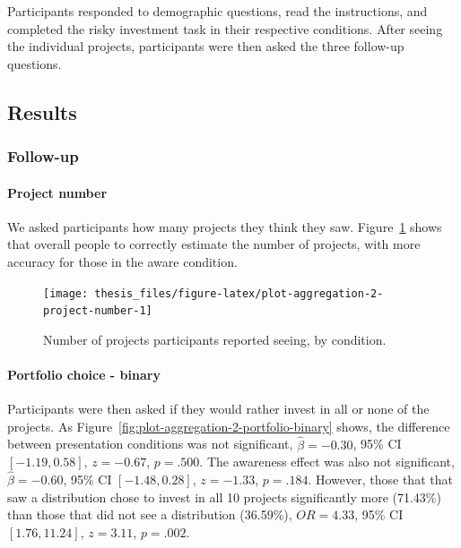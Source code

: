 \documentclass[a4paper, nobind, dvipsnames]{templates/ociamthesis}
\theoremstyle{definition}
\theoremstyle{definition}
\theoremstyle{definition}
\theoremstyle{definition}
\theoremstyle{remark}
\begin{document}
Participants responded to demographic questions, read the instructions, and
completed the risky investment task in their respective conditions. After seeing
the individual projects, participants were then asked the three follow-up
questions.

\hypertarget{results-aggregation-2-appendix}{%
\subsection{Results}\label{results-aggregation-2-appendix}}

\hypertarget{follow-up-1}{%
\subsubsection{Follow-up}\label{follow-up-1}}

\hypertarget{project-number}{%
\paragraph{Project number}\label{project-number}}

We asked participants how many projects they think they saw.
Figure~\ref{fig:plot-aggregation-2-project-number} shows that overall people
to correctly estimate the number of projects, with more accuracy for those in
the aware condition.



\begin{figure}
\texttt{[image: thesis\_files/figure-latex/plot-aggregation-2-project-number-1]} \caption{Number of projects participants reported seeing, by condition.}\label{fig:plot-aggregation-2-project-number}
\end{figure}

\hypertarget{portfolio-choice---binary}{%
\paragraph{Portfolio choice - binary}\label{portfolio-choice---binary}}

Participants were then asked if they would rather invest in all or none of the
projects. As Figure~\ref{fig:plot-aggregation-2-portfolio-binary} shows, the
difference between presentation conditions was not significant,
\(\hat{\beta} = -0.30\), 95\% CI \([-1.19, 0.58]\), \(z = -0.67\), \(p = .500\). The
awareness effect was also not significant,
\(\hat{\beta} = -0.60\), 95\% CI \([-1.48, 0.28]\), \(z = -1.33\), \(p = .184\). However,
those that that saw a distribution chose to invest in all 10 projects
significantly more
(71.43\%) than
those that did not see a distribution
(36.59\%),
\(OR = 4.33\), 95\% CI \([1.76, 11.24]\), \(z = 3.11\), \(p = .002\).
\end{document}

